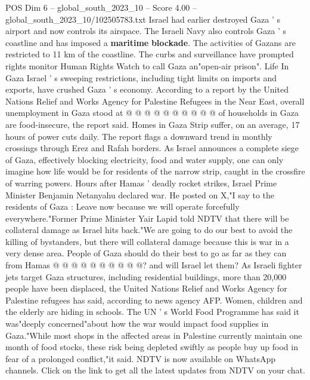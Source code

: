 \begin{textsample}{POS Dim 6 – global\_south\_2023\_10 – Score 4.00 – global\_south\_2023\_10/102505783.txt}
Israel had earlier destroyed Gaza ' s airport and now controls its airspace.
The Israeli Navy also controls Gaza ' s coastline and has imposed a \textbf{maritime} \textbf{blockade}.
The activities of Gazans are restricted to 11 km of the coastline.
The curbs and surveillance have prompted rights monitor Human Rights Watch to call Gaza an"open-air prison".
Life In Gaza Israel ' s sweeping restrictions, including tight limits on imports and exports, have crushed Gaza ' s economy.
According to a report by the United Nations Relief and Works Agency for Palestine Refugees in the Near East, overall unemployment in Gaza stood at @ @ @ @ @ @ @ @ @ @ of households in Gaza are food-insecure, the report said.
Homes in Gaza Strip suffer, on an average, 17 hours of power cuts daily.
The report flags a downward trend in monthly crossings through Erez and Rafah borders.
As Israel announces a complete siege of Gaza, effectively blocking electricity, food and water supply, one can only imagine how life would be for residents of the narrow strip, caught in the crossfire of warring powers.
Hours after Hamas ' deadly rocket strikes, Israel Prime Minister Benjamin Netanyahu declared war.
He posted on X,"I say to the residents of Gaza : Leave now because we will operate forcefully everywhere."Former Prime Minister Yair Lapid told NDTV that there will be collateral damage as Israel hits back."We are going to do our best to avoid the killing of bystanders, but there will collateral damage because this is war in a very dense area.
People of Gaza should do their best to go as far as they can from Hamas @ @ @ @ @ @ @ @ @ @? and will Israel let them?
As Israeli fighter jets target Gaza structures, including residential buildings, more than 20,000 people have been displaced, the United Nations Relief and Works Agency for Palestine refugees has said, according to news agency AFP.
Women, children and the elderly are hiding in schools.
The UN ' s World Food Programme has said it was"deeply concerned"about how the war would impact food supplies in Gaza."While most shops in the affected areas in Palestine currently maintain one month of food stocks, these risk being depleted swiftly as people buy up food in fear of a prolonged conflict,"it said.
NDTV is now available on WhatsApp channels.
Click on the link to get all the latest updates from NDTV on your chat.

\end{textsample}
